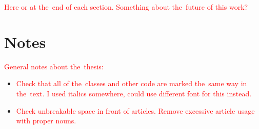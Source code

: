 	\textcolor{red}{Here or at the~end of each section. Something about the~future of this work?}
	
	\section*{Notes}
		\textcolor{red}{General notes about the~thesis:}
		\begin{itemize}
			\item \textcolor{red}{Check that all of the~classes and other code are marked the~same way in the~text. I used italics somewhere, could use different font for this instead.}
			\item \textcolor{red}{Check unbreakable space in front of articles. Remove excessive article usage with proper nouns.}
		\end{itemize}
